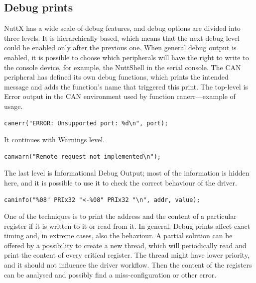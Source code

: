 \documentclass{ctuthesis}
\begin{document}
 \subsection{Debug prints}
 NuttX has a wide scale of debug features, and debug options are divided into three levels. It is hierarchically based, which means that the next debug level could be enabled only after the previous one. When general debug output is enabled, it is possible to choose which peripherals will have the right to write to the console device, for example, the NuttShell in the serial console. The CAN peripheral has defined its own debug functions, which prints the intended message and adds the function’s name that triggered this print. The top-level is Error output in the CAN environment used by function canerr—example of usage.
\begin{verbatim}
canerr("ERROR: Unsupported port: %d\n", port);
\end{verbatim}
 It continues with Warnings level.
\begin{verbatim}
canwarn("Remote request not implemented\n");
\end{verbatim}
 The last level is Informational Debug Output; most of the information is hidden here, and it is possible to use it to check the correct behaviour of the driver.
\begin{verbatim}
caninfo("%08" PRIx32 "<-%08" PRIx32 "\n", addr, value);
\end{verbatim}
 One of the techniques is to print the address and the content of a particular register if it is written to it or read from it. In general, Debug prints affect exact timing and, in extreme cases, also the behaviour. A partial solution can be offered by a possibility to create a new thread, which will periodically read and print the content of every critical register. The thread might have lower priority, and it should not influence the driver workflow. Then the content of the registers can be analysed  and possibly find a miss-configuration or other error.
 
\end{document}
